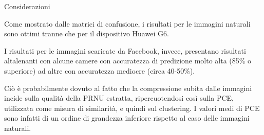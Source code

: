\begin{tframe}{Considerazioni}

Come mostrato dalle matrici di confusione, i risultati per le immagini naturali sono ottimi tranne che per il dispositivo Huawei G6.

\vspace{0.1in}

I risultati per le immagini scaricate da Facebook, invece, presentano risultati altalenanti con alcune camere con accuratezza di predizione molto alta (85\% o superiore) ad altre con accuratezza mediocre (circa 40-50\%). 

\vspace{0.1in}

Ciò è probabilmente dovuto al fatto che la compressione subita dalle immagini incide sulla qualità della PRNU estratta, ripercuotendosi così sulla PCE, utilizzata come misura di similarità, e quindi sul clustering. I valori medi di PCE sono infatti di un ordine di grandezza inferiore rispetto al caso delle immagini naturali.

\end{tframe}